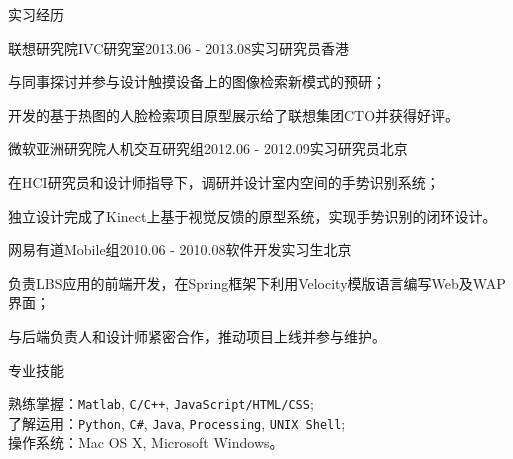 \documentclass{cv_professional-cn} %
\begin{document}
\begin{rSection}{实习经历}
    
\begin{rSubsection}{联想研究院IVC研究室}{2013.06 - 2013.08}{实习研究员}{香港}
    \item 与同事探讨并参与设计触摸设备上的图像检索新模式的预研；
    \item 开发的基于热图的人脸检索项目原型展示给了联想集团CTO并获得好评。
\end{rSubsection}

\begin{rSubsection}{微软亚洲研究院人机交互研究组}{2012.06 - 2012.09}{实习研究员}{北京}
    \item 在HCI研究员和设计师指导下，调研并设计室内空间的手势识别系统；
    \item 独立设计完成了Kinect上基于视觉反馈的原型系统，实现手势识别的闭环设计。
\end{rSubsection}

\begin{rSubsection}{网易有道Mobile组}{2010.06 - 2010.08}{软件开发实习生}{北京}
    \item 负责LBS应用的前端开发，在Spring框架下利用Velocity模版语言编写Web及WAP界面；
    \item 与后端负责人和设计师紧密合作，推动项目上线并参与维护。
\end{rSubsection}

\end{rSection}


\begin{rSection}{专业技能}

熟练掌握：\texttt{Matlab}, \texttt{C/C++}, \texttt{JavaScript/HTML/CSS}; \\   
了解运用：\texttt{Python}, \texttt{C\#}, \texttt{Java}, \texttt{Processing}, \texttt{UNIX Shell}; \\       
操作系统：Mac OS X, Microsoft Windows。

\end{rSection}

\end{document}
